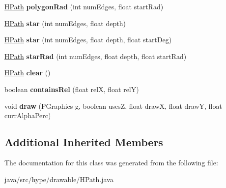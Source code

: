 \begin{DoxyCompactItemize}
\item 
\hypertarget{classhype_1_1drawable_1_1_h_path_a2e50e660109761776241d9c41e8fb132}{\hyperlink{classhype_1_1drawable_1_1_h_path}{H\-Path} {\bfseries polygon\-Rad} (int num\-Edges, float start\-Rad)}\label{classhype_1_1drawable_1_1_h_path_a2e50e660109761776241d9c41e8fb132}

\item 
\hypertarget{classhype_1_1drawable_1_1_h_path_a80d11cfd16ae84a07aa52b7d59e301ce}{\hyperlink{classhype_1_1drawable_1_1_h_path}{H\-Path} {\bfseries star} (int num\-Edges, float depth)}\label{classhype_1_1drawable_1_1_h_path_a80d11cfd16ae84a07aa52b7d59e301ce}

\item 
\hypertarget{classhype_1_1drawable_1_1_h_path_a7331d86a61b558eb840ac66da5a23f4e}{\hyperlink{classhype_1_1drawable_1_1_h_path}{H\-Path} {\bfseries star} (int num\-Edges, float depth, float start\-Deg)}\label{classhype_1_1drawable_1_1_h_path_a7331d86a61b558eb840ac66da5a23f4e}

\item 
\hypertarget{classhype_1_1drawable_1_1_h_path_acaae9c01f4b330740a387f6e55b82b7b}{\hyperlink{classhype_1_1drawable_1_1_h_path}{H\-Path} {\bfseries star\-Rad} (int num\-Edges, float depth, float start\-Rad)}\label{classhype_1_1drawable_1_1_h_path_acaae9c01f4b330740a387f6e55b82b7b}

\item 
\hypertarget{classhype_1_1drawable_1_1_h_path_aae95fc174db2c006e5cb7f2df99b5232}{\hyperlink{classhype_1_1drawable_1_1_h_path}{H\-Path} {\bfseries clear} ()}\label{classhype_1_1drawable_1_1_h_path_aae95fc174db2c006e5cb7f2df99b5232}

\item 
\hypertarget{classhype_1_1drawable_1_1_h_path_a2f3932e890ba712db9935def871ffc5d}{boolean {\bfseries contains\-Rel} (float rel\-X, float rel\-Y)}\label{classhype_1_1drawable_1_1_h_path_a2f3932e890ba712db9935def871ffc5d}

\item 
\hypertarget{classhype_1_1drawable_1_1_h_path_af4d2d92b1c30aa6f9f7e91ab162364c0}{void {\bfseries draw} (P\-Graphics g, boolean uses\-Z, float draw\-X, float draw\-Y, float curr\-Alpha\-Perc)}\label{classhype_1_1drawable_1_1_h_path_af4d2d92b1c30aa6f9f7e91ab162364c0}

\end{DoxyCompactItemize}
\subsection*{Additional Inherited Members}


The documentation for this class was generated from the following file\-:\begin{DoxyCompactItemize}
\item 
java/src/hype/drawable/H\-Path.\-java\end{DoxyCompactItemize}
